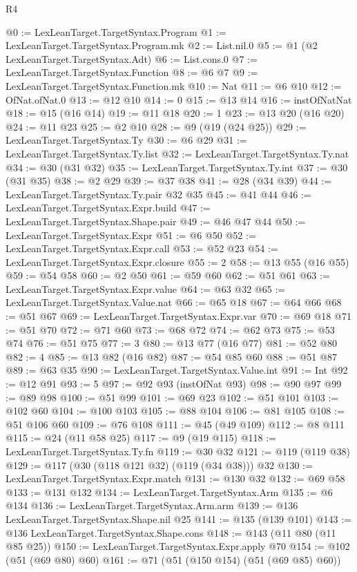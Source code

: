\begin{lexlean}{R4}
\begin{coremodule}
{{{{{{{{{{{{{{{{{{{{@0 := LexLeanTarget.TargetSyntax.Program
@1 := LexLeanTarget.TargetSyntax.Program.mk
@2 := List.nil.{0}
@5 := @1 (@2 LexLeanTarget.TargetSyntax.Adt)
@6 := List.cons.{0}
@7 := LexLeanTarget.TargetSyntax.Function
@8 := @6 @7
@9 := LexLeanTarget.TargetSyntax.Function.mk
@10 := Nat
@11 := @6 @10
@12 := OfNat.ofNat.{0}
@13 := @12 @10
@14 := 0
@15 := @13 @14
@16 := instOfNatNat
@18 := @15 (@16 @14)
@19 := @11 @18
@20 := 1
@23 := @13 @20 (@16 @20)
@24 := @11 @23
@25 := @2 @10
@28 := @9 (@19 (@24 @25))
@29 := LexLeanTarget.TargetSyntax.Ty
@30 := @6 @29
@31 := LexLeanTarget.TargetSyntax.Ty.list
@32 := LexLeanTarget.TargetSyntax.Ty.nat
@34 := @30 (@31 @32)
@35 := LexLeanTarget.TargetSyntax.Ty.int
@37 := @30 (@31 @35)
@38 := @2 @29
@39 := @37 @38
@41 := @28 (@34 @39)
@44 := LexLeanTarget.TargetSyntax.Ty.pair @32 @35
@45 := @41 @44
@46 := LexLeanTarget.TargetSyntax.Expr.build
@47 := LexLeanTarget.TargetSyntax.Shape.pair
@49 := @46 @47 @44
@50 := LexLeanTarget.TargetSyntax.Expr
@51 := @6 @50
@52 := LexLeanTarget.TargetSyntax.Expr.call
@53 := @52 @23
@54 := LexLeanTarget.TargetSyntax.Expr.closure
@55 := 2
@58 := @13 @55 (@16 @55)
@59 := @54 @58
@60 := @2 @50
@61 := @59 @60
@62 := @51 @61
@63 := LexLeanTarget.TargetSyntax.Expr.value
@64 := @63 @32
@65 := LexLeanTarget.TargetSyntax.Value.nat
@66 := @65 @18
@67 := @64 @66
@68 := @51 @67
@69 := LexLeanTarget.TargetSyntax.Expr.var
@70 := @69 @18
@71 := @51 @70
@72 := @71 @60
@73 := @68 @72
@74 := @62 @73
@75 := @53 @74
@76 := @51 @75
@77 := 3
@80 := @13 @77 (@16 @77)
@81 := @52 @80
@82 := 4
@85 := @13 @82 (@16 @82)
@87 := @54 @85 @60
@88 := @51 @87
@89 := @63 @35
@90 := LexLeanTarget.TargetSyntax.Value.int
@91 := Int
@92 := @12 @91
@93 := 5
@97 := @92 @93 (instOfNat @93)
@98 := @90 @97
@99 := @89 @98
@100 := @51 @99
@101 := @69 @23
@102 := @51 @101
@103 := @102 @60
@104 := @100 @103
@105 := @88 @104
@106 := @81 @105
@108 := @51 @106 @60
@109 := @76 @108
@111 := @45 (@49 @109)
@112 := @8 @111
@115 := @24 (@11 @58 @25)
@117 := @9 (@19 @115)
@118 := LexLeanTarget.TargetSyntax.Ty.fn
@119 := @30 @32
@121 := @119 (@119 @38)
@129 := @117 (@30 (@118 @121 @32) (@119 (@34 @38))) @32
@130 := LexLeanTarget.TargetSyntax.Expr.match
@131 := @130 @32
@132 := @69 @58
@133 := @131 @132
@134 := LexLeanTarget.TargetSyntax.Arm
@135 := @6 @134
@136 := LexLeanTarget.TargetSyntax.Arm.arm
@139 := @136 LexLeanTarget.TargetSyntax.Shape.nil @25
@141 := @135 (@139 @101)
@143 := @136 LexLeanTarget.TargetSyntax.Shape.cons
@148 := @143 (@11 @80 (@11 @85 @25))
@150 := LexLeanTarget.TargetSyntax.Expr.apply @70
@154 := @102 (@51 (@69 @80) @60)
@161 := @71 (@51 (@150 @154) (@51 (@69 @85) @60))
}}}}}}}}}}}}}}}}}}}}
\end{coremodule}
\end{lexlean}
